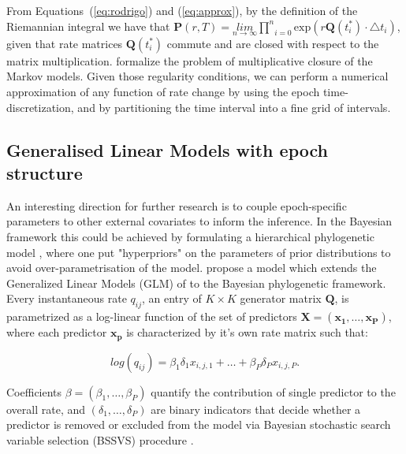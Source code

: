 \noindent
From Equations~(\ref{eq:rodrigo}) and (\ref{eq:approx}), by the definition of the Riemannian integral we have that $\mathbf{P}(r,T)=\underset{n\rightarrow\infty}{lim}\underset{i=0}{\overset{n}{\prod}}\text{exp}\left(r\mathbf{Q}(t_{i}^{*})\cdot\triangle t_{i}\right)$, given that rate matrices $\mathbf{Q}(t_{i}^{*})$ commute 
and are closed with respect to the matrix multiplication.
\citet{Sumner2012} formalize the problem of multiplicative closure of the Markov models. 
Given those regularity conditions, we can perform a numerical approximation of any function of rate change by using the epoch time-discretization, and by partitioning the time interval into a fine grid of intervals. 

\subsection{Generalised Linear Models with epoch structure}

An interesting direction for further research is to couple epoch-specific parameters to other external covariates to inform the inference.
In the Bayesian framework this could be achieved by formulating a hierarchical phylogenetic model \citep{Edo-Matas2011}, where one put "hyperpriors" on the parameters of prior distributions to avoid over-parametrisation of the model.
\citet{Lemey2014} propose a model which extends the Generalized Linear Models (GLM) of \citet{Nelder1972} to the Bayesian phylogenetic framework.
Every instantaneous rate $q_{ij}$, an entry of $K \times K$ generator matrix $\mathbf{Q}$, is parametrized as a log-linear function of the set of predictors $\mathbf{X}=\left( \mathbf{x_{1}},\ldots,\mathbf{x_{P}}\right)$, where each predictor $\mathbf{x_{p}}$ is characterized by it's own rate matrix such that:

\begin{equation}
log(q_{ij})=\beta_{1}\delta_{1}x_{i,j,1}+\ldots+\beta_{P}\delta_{P}x_{i,j,P}.
\label{eq:glm}
\end{equation}

Coefficients $\beta=\left(\beta_{1},\ldots,\beta_{P}\right)$ quantify the contribution of single predictor to the overall rate, and $\left(\delta_{1},\ldots,\delta_{P}\right)$ are binary indicators that decide whether a predictor is removed or excluded from the model via Bayesian stochastic search variable selection (BSSVS) procedure \citep{Kuo1998,Lemey2009}.

